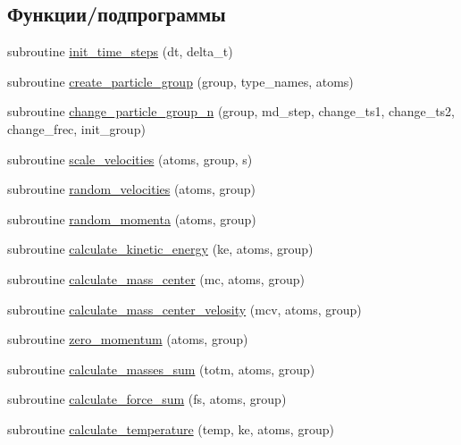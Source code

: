 \subsection*{Функции/подпрограммы}
\begin{DoxyCompactItemize}
\item 
subroutine \mbox{\hyperlink{namespacemd__general_a3a69c40fe5a6e7938d398f803b21e474}{init\+\_\+time\+\_\+steps}} (dt, delta\+\_\+t)
\item 
subroutine \mbox{\hyperlink{namespacemd__general_a6e847bdd3b7115bf5ff69e8cd8e68d7f}{create\+\_\+particle\+\_\+group}} (group, type\+\_\+names, atoms)
\item 
subroutine \mbox{\hyperlink{namespacemd__general_a5614c27d83ed003aa01d3be2f1b45c57}{change\+\_\+particle\+\_\+group\+\_\+n}} (group, md\+\_\+step, change\+\_\+ts1, change\+\_\+ts2, change\+\_\+frec, init\+\_\+group)
\item 
subroutine \mbox{\hyperlink{namespacemd__general_ad4ad26fa9584c63f846d49033ce92987}{scale\+\_\+velocities}} (atoms, group, s)
\item 
subroutine \mbox{\hyperlink{namespacemd__general_a326a2fe1c1da84197c4566801133648a}{random\+\_\+velocities}} (atoms, group)
\item 
subroutine \mbox{\hyperlink{namespacemd__general_a8192b37ec3462b5fcb7fabf17c8eb658}{random\+\_\+momenta}} (atoms, group)
\item 
subroutine \mbox{\hyperlink{namespacemd__general_a0949b9217f73c42e2c7ea47a4e559e39}{calculate\+\_\+kinetic\+\_\+energy}} (ke, atoms, group)
\item 
subroutine \mbox{\hyperlink{namespacemd__general_aafe7eb801a25cbfeff68d5574b9fc152}{calculate\+\_\+mass\+\_\+center}} (mc, atoms, group)
\item 
subroutine \mbox{\hyperlink{namespacemd__general_a39191e16e77e39d5486e4daaeaa2522e}{calculate\+\_\+mass\+\_\+center\+\_\+velosity}} (mcv, atoms, group)
\item 
subroutine \mbox{\hyperlink{namespacemd__general_a79ea9e512a27c651278559e30f97a336}{zero\+\_\+momentum}} (atoms, group)
\item 
subroutine \mbox{\hyperlink{namespacemd__general_a77b50b971bc4812a1299348a398491e0}{calculate\+\_\+masses\+\_\+sum}} (totm, atoms, group)
\item 
subroutine \mbox{\hyperlink{namespacemd__general_ac5733857b75ce71aa32a105751e4dfd5}{calculate\+\_\+force\+\_\+sum}} (fs, atoms, group)
\item 
subroutine \mbox{\hyperlink{namespacemd__general_a1de2d09f44a8dc5b96fc5eb221845cc1}{calculate\+\_\+temperature}} (temp, ke, atoms, group)

\end{DoxyCompactItemize}

